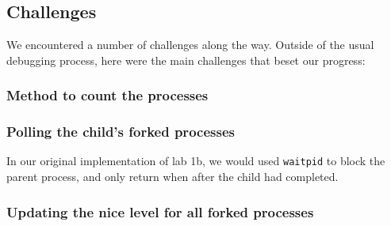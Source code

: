 \documentclass{article}
\begin{document}
\subsection{Challenges}
We encountered a number of challenges along the way. Outside of the usual 
debugging process, here were the main challenges that beset our progress:
\subsubsection{Method to count the processes}
\subsubsection{Polling the child's forked processes}
In our original implementation of lab 1b, we would used \verb+waitpid+ to block
the parent process, and only return when after the child had completed. 
\subsubsection{Updating the nice level for all forked processes}







\end{document}
